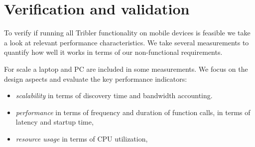 \chapter{Verification and validation}
\label{ch:results}

To verify if running all Tribler functionality on mobile devices is feasible we take a look at relevant performance characteristics.
We take several measurements to quantify how well it works in terms of our non-functional requirements.

For scale a laptop and PC are included in some measurements.
We focus on the design aspects and evaluate the key performance indicators:
\begin{itemize}
	\item{\emph{scalability} in terms of discovery time and bandwidth accounting.}
	\item{\emph{performance} in terms of frequency and duration of function calls, in terms of latency and startup time,}
	\item{\emph{resource usage} in terms of CPU utilization,}
\end{itemize}



